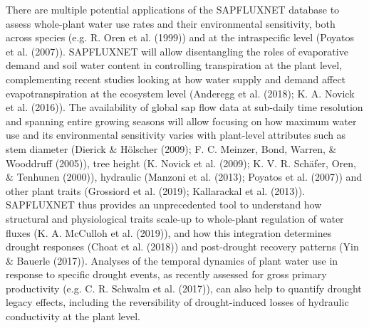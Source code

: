 \documentclass[11pt,twoside]{reedthesis}
\begin{document}
There are multiple potential applications of the SAPFLUXNET database to
assess whole-plant water use rates and their environmental sensitivity,
both across species (e.g. R. Oren et al. (1999)) and at the
intraspecific level (Poyatos et al. (2007)). SAPFLUXNET will allow
disentangling the roles of evaporative demand and soil water content in
controlling transpiration at the plant level, complementing recent
studies looking at how water supply and demand affect evapotranspiration
at the ecosystem level (Anderegg et al. (2018); K. A. Novick et al.
(2016)). The availability of global sap flow data at sub-daily time
resolution and spanning entire growing seasons will allow focusing on
how maximum water use and its environmental sensitivity varies with
plant-level attributes such as stem diameter (Dierick \& Hölscher
(2009); F. C. Meinzer, Bond, Warren, \& Wooddruff (2005)), tree height
(K. Novick et al. (2009); K. V. R. Schäfer, Oren, \& Tenhunen (2000)),
hydraulic (Manzoni et al. (2013); Poyatos et al. (2007)) and other plant
traits (Grossiord et al. (2019); Kallarackal et al. (2013)). SAPFLUXNET
thus provides an unprecedented tool to understand how structural and
physiological traits scale-up to whole-plant regulation of water fluxes
(K. A. McCulloh et al. (2019)), and how this integration determines
drought responses (Choat et al. (2018)) and post-drought recovery
patterns (Yin \& Bauerle (2017)). Analyses of the temporal dynamics of
plant water use in response to specific drought events, as recently
assessed for gross primary productivity (e.g. C. R. Schwalm et al.
(2017)), can also help to quantify drought legacy effects, including the
reversibility of drought-induced losses of hydraulic conductivity at the
plant level.\par
\end{document}
